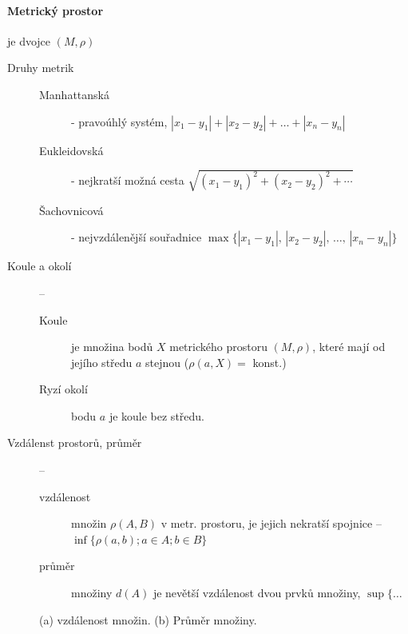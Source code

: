 \documentclass[a4paper, twoside,%
12pt]{article}
\begin{document}
\paragraph{Metrický prostor} je dvojce $(M, \rho)$
\begin{description}
    \item[Druhy metrik] \begin{description}
        \item[Manhattanská] - pravoúhlý systém, $|x_1 - y_1|+|x_2 - y_2|+ \dots +|x_n - y_n|$
        \item[Eukleidovská] - nejkratší možná cesta $\sqrt{(x_1 - y_1)^2 + (x_2 - y_2)^2 + \cdots }$ 
        \item[Šachovnicová] - nejvzdálenější souřadnice $\max\{ |x_1 - y_1|,\,|x_2 - y_2|,\, \dots,\,|x_n - y_n| \}$
    \end{description} 
    \item[Koule a okolí] --    
    \begin{description}
        \item[Koule] je množina bodů $X$ metrického prostoru $(M, \rho)$, které mají od jejího středu $a$ stejnou  ($\rho(a,X)= $ konst.) 
        \item[Ryzí okolí] bodu $a$ je koule bez středu.
    \end{description}
    \item[Vzdálenst prostorů, průměr] --
    \begin{description}
        \item[vzdálenost] množin $\rho (A,B)$ v metr. prostoru, je jejich nekratší spojnice -- $\inf\lbrace \rho(a,b); a \in A; b \in B \rbrace$
        \item[průměr] množiny $d(A)$ je nevětší vzdálenost dvou prvků množiny, $\sup\lbrace \dots$
    \end{description}
\end{description}

\begin{figure}[h]
    \centering
    \begin{subfigure}[b]{10cm}
        
        \caption{}
    \end{subfigure}
    \begin{subfigure}[b]{0.3\textwidth}
        
        \caption{}
    \end{subfigure}
    \caption{(a) vzdálenost množin. (b) Průměr množiny.}
    \label{}
\end{figure}
\end{document}
